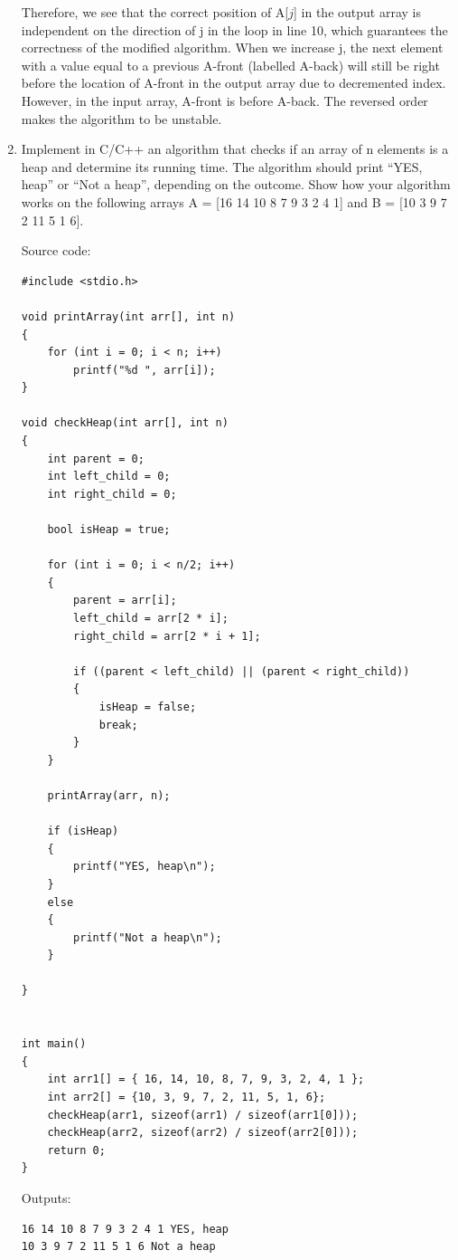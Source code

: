 \documentclass[11pts]{report}
\begin{document}
\begin{enumerate}
\par Therefore, we see that the correct position of A[$j$] in the output array is independent on the direction of j in the loop in line 10, which guarantees the correctness of the modified algorithm. When we increase j, the next element with a value equal to a previous A-front (labelled A-back) will still be right before the location of A-front in the output array due to decremented index. However, in the input array, A-front is before A-back. The reversed order makes the algorithm to be unstable.
\item Implement in C/C++ an algorithm that checks if an array of n elements is a heap and determine its running time. The algorithm should print “YES, heap” or “Not a heap”, depending on the outcome. Show how your algorithm works on the
following arrays A = [16 14 10 8 7 9 3 2 4 1] and B = [10 3 9 7 2 11 5 1 6].

\par Source code:

\begin{lstlisting}
#include <stdio.h> 
  
void printArray(int arr[], int n) 
{ 
    for (int i = 0; i < n; i++) 
        printf("%d ", arr[i]); 
}

void checkHeap(int arr[], int n) 
{ 
    int parent = 0;
    int left_child = 0;
    int right_child = 0;

    bool isHeap = true;

    for (int i = 0; i < n/2; i++)
    {
        parent = arr[i];
        left_child = arr[2 * i];
        right_child = arr[2 * i + 1];

        if ((parent < left_child) || (parent < right_child))
        {
            isHeap = false;
            break;
        }
    } 

    printArray(arr, n);
    
    if (isHeap)
    {
        printf("YES, heap\n");
    }
    else
    {
        printf("Not a heap\n");
    }

}

  
int main() 
{ 
    int arr1[] = { 16, 14, 10, 8, 7, 9, 3, 2, 4, 1 }; 
    int arr2[] = {10, 3, 9, 7, 2, 11, 5, 1, 6};
    checkHeap(arr1, sizeof(arr1) / sizeof(arr1[0]));
    checkHeap(arr2, sizeof(arr2) / sizeof(arr2[0]));
    return 0; 
} 
\end{lstlisting}

\par Outputs:
\begin{lstlisting}
16 14 10 8 7 9 3 2 4 1 YES, heap
10 3 9 7 2 11 5 1 6 Not a heap
\end{lstlisting}


\end{enumerate}
\end{document}

